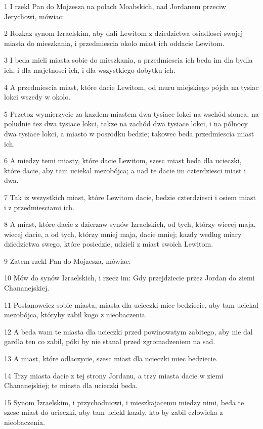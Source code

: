 \par 1 I rzekl Pan do Mojzesza na polach Moabskich, nad Jordanem przeciw Jerychowi, mówiac:
\par 2 Rozkaz synom Izraelskim, aby dali Lewitom z dziedzictwa osiadlosci swojej miasta do mieszkania, i przedmiescia okolo miast ich oddacie Lewitom.
\par 3 I beda mieli miasta sobie do mieszkania, a przedmiescia ich beda im dla bydla ich, i dla majetnosci ich, i dla wszystkiego dobytku ich.
\par 4 A przedmiescia miast, które dacie Lewitom, od muru miejskiego pójda na tysiac lokci wszedy w okolo.
\par 5 Przetoz wymierzycie za kazdem miastem dwa tysiace lokci na wschód slonca, na poludnie tez dwa tysiace lokci, takze na zachód dwa tysiace lokci, i na pólnocy dwa tysiace lokci, a miasto w posrodku bedzie; takowec beda przedmiescia miast ich.
\par 6 A miedzy temi miasty, które dacie Lewitom, szesc miast beda dla ucieczki, które dacie, aby tam uciekal mezobójca; a nad te dacie im czterdziesci miast i dwa.
\par 7 Tak iz wszystkich miast, które Lewitom dacie, bedzie czterdziesci i osiem miast i z przedmiesciami ich.
\par 8 A miast, które dacie z dzierzaw synów Izraelskich, od tych, którzy wiecej maja, wiecej dacie, a od tych, którzy mniej maja, dacie mniej; kazdy wedlug miary dziedzictwa swego, które posiedzie, udzieli z miast swoich Lewitom.
\par 9 Zatem rzekl Pan do Mojzesza, mówiac:
\par 10 Mów do synów Izraelskich, i rzecz im: Gdy przejdziecie przez Jordan do ziemi Chananejskiej.
\par 11 Postanowciez sobie miasta; miasta dla ucieczki miec bedziecie, aby tam uciekal mezobójca, któryby zabil kogo z nieobaczenia.
\par 12 A beda wam te miasta dla ucieczki przed powinowatym zabitego, aby nie dal gardla ten co zabil, póki by nie stanal przed zgromadzeniem na sad.
\par 13 A miast, które odlaczycie, szesc miast dla ucieczki miec bedziecie.
\par 14 Trzy miasta dacie z tej strony Jordanu, a trzy miasta dacie w ziemi Chananejskiej; te miasta dla ucieczki beda.
\par 15 Synom Izraelskim, i przychodniowi, i mieszkajacemu miedzy nimi, beda te szesc miast do ucieczki, aby tam uciekl kazdy, kto by zabil czlowieka z nieobaczenia.
